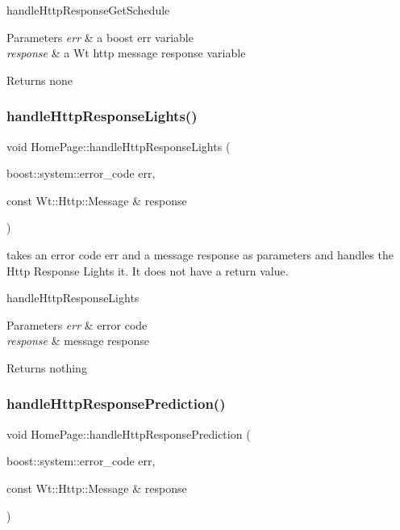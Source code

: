handle\+Http\+Response\+Get\+Schedule 
\begin{DoxyParams}{Parameters}
{\em err} & a boost err variable \\
\hline
{\em response} & a Wt http message response variable \\
\hline
\end{DoxyParams}
\begin{DoxyReturn}{Returns}
none 
\end{DoxyReturn}
\mbox{\label{class_home_page_a7ca1f03912ee0763d6fd25e1c4b21eff}} 
\subsubsection{\texorpdfstring{handle\+Http\+Response\+Lights()}{handleHttpResponseLights()}}
{\footnotesize\ttfamily void Home\+Page\+::handle\+Http\+Response\+Lights (\begin{DoxyParamCaption}\item[{boost\+::system\+::error\+\_\+code}]{err,  }\item[{const Wt\+::\+Http\+::\+Message \&}]{response }\end{DoxyParamCaption})\hspace{0.3cm}{\ttfamily [private]}}



takes an error code err and a message response as parameters and handles the Http Response Lights it. It does not have a return value. 

handle\+Http\+Response\+Lights 
\begin{DoxyParams}{Parameters}
{\em err} & error code \\
\hline
{\em response} & message response \\
\hline
\end{DoxyParams}
\begin{DoxyReturn}{Returns}
nothing 
\end{DoxyReturn}
\mbox{\label{class_home_page_a35ecb731b87a0b752be365d42dfa8bf7}} 
\subsubsection{\texorpdfstring{handle\+Http\+Response\+Prediction()}{handleHttpResponsePrediction()}}
{\footnotesize\ttfamily void Home\+Page\+::handle\+Http\+Response\+Prediction (\begin{DoxyParamCaption}\item[{boost\+::system\+::error\+\_\+code}]{err,  }\item[{const Wt\+::\+Http\+::\+Message \&}]{response }\end{DoxyParamCaption})\hspace{0.3cm}{\ttfamily [private]}}



